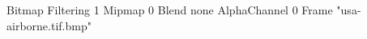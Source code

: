 {Bitmap
	{Filtering 1}
	{Mipmap 0}
	{Blend none}
	{AlphaChannel 0}
	{Frame "usa-airborne.tif.bmp"}
}
